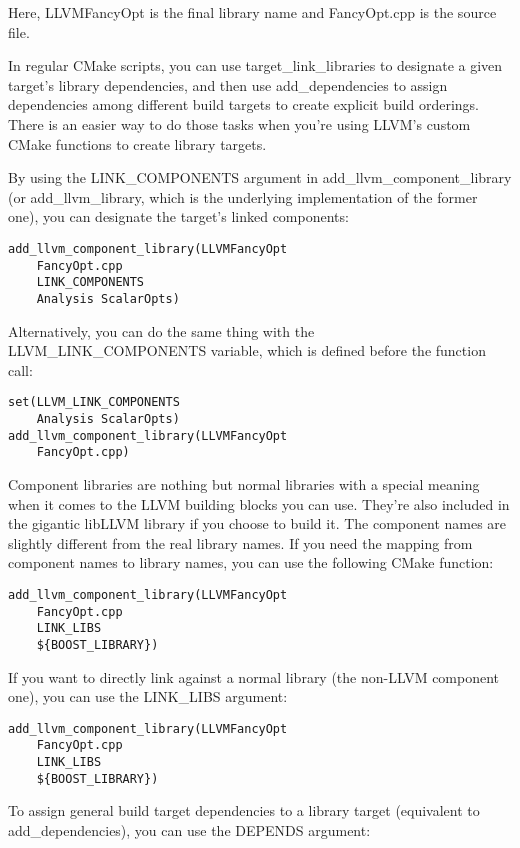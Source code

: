 Here, LLVMFancyOpt is the final library name and FancyOpt.cpp is the source file.

In regular CMake scripts, you can use target\_link\_libraries to designate a given target's library dependencies, and then use add\_dependencies to assign dependencies among different build targets to create explicit build orderings. There is an easier way to do those tasks when you're using LLVM's custom CMake functions to create library targets.

By using the LINK\_COMPONENTS argument in add\_llvm\_component\_library (or add\_llvm\_library, which is the underlying implementation of the former one), you can designate the target's linked components:

\begin{lstlisting}[style=styleCMake]
add_llvm_component_library(LLVMFancyOpt
	FancyOpt.cpp
	LINK_COMPONENTS
	Analysis ScalarOpts)
\end{lstlisting}

Alternatively, you can do the same thing with the LLVM\_LINK\_COMPONENTS variable, which is defined before the function call:

\begin{lstlisting}[style=styleCMake]
set(LLVM_LINK_COMPONENTS
	Analysis ScalarOpts)
add_llvm_component_library(LLVMFancyOpt
	FancyOpt.cpp)
\end{lstlisting}

Component libraries are nothing but normal libraries with a special meaning when it comes to the LLVM building blocks you can use. They're also included in the gigantic libLLVM library if you choose to build it. The component names are slightly different from the real library names. If you need the mapping from component names to library names, you can use the following CMake function:

\begin{lstlisting}[style=styleCMake]
add_llvm_component_library(LLVMFancyOpt
	FancyOpt.cpp
	LINK_LIBS
	${BOOST_LIBRARY})
\end{lstlisting}

If you want to directly link against a normal library (the non-LLVM component one), you can use the LINK\_LIBS argument:

\begin{lstlisting}[style=styleCMake]
add_llvm_component_library(LLVMFancyOpt
	FancyOpt.cpp
	LINK_LIBS
	${BOOST_LIBRARY})
\end{lstlisting}

To assign general build target dependencies to a library target (equivalent to add\_dependencies), you can use the DEPENDS argument:

